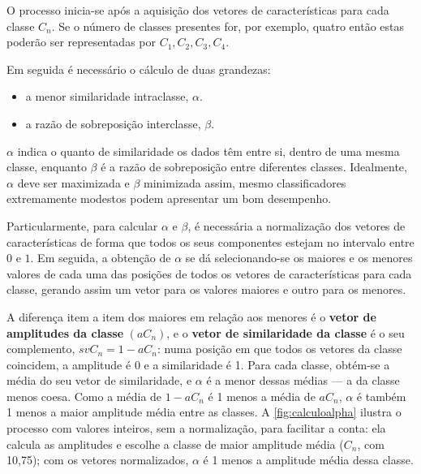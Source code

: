 			\par O processo inicia-se após a aquisição dos vetores de características para cada classe $C_n$. Se o número de classes presentes for, por exemplo, quatro então estas poderão ser representadas por $C_1, C_2, C_3, C_4$.
			\par Em seguida é necessário o cálculo de duas grandezas:
			
			\begin{itemize}
				\item a menor similaridade intraclasse, $\alpha$.
				\item a razão de sobreposição interclasse, $\beta$.
			\end{itemize}
	
			\par $\alpha$ indica o quanto de similaridade os dados têm entre si, dentro de uma mesma classe, enquanto $\beta$ é a razão de sobreposição entre diferentes classes. Idealmente, $\alpha$ deve ser maximizada e $\beta$ minimizada assim, mesmo classificadores extremamente modestos podem apresentar um bom desempenho.
			
			\par Particularmente, para calcular $\alpha$ e $\beta$, é necessária a normalização dos vetores de características de forma que todos os seus componentes estejam no intervalo entre $0$ e $1$. Em seguida, a obtenção de $\alpha$ se dá selecionando-se os maiores e os menores valores de cada uma das posições de todos os vetores de características para cada classe, gerando assim um vetor para os valores maiores e outro para os menores.
			
			\par A diferença item a item dos maiores em relação aos menores é o \textbf{vetor de amplitudes da classe} $(aC_n)$, e o \textbf{vetor de similaridade da classe} é o seu complemento, $svC_n = 1 - aC_n$: numa posição em que todos os vetores da classe coincidem, a amplitude é 0 e a similaridade é 1. Para cada classe, obtém-se a média do seu vetor de similaridade, e $\alpha$ é a menor dessas médias --- a da classe menos coesa. Como a média de $1 - aC_n$ é 1 menos a média de $aC_n$, $\alpha$ é também 1 menos a maior amplitude média entre as classes. A \autoref{fig:calculoalpha} ilustra o processo com valores inteiros, sem a normalização, para facilitar a conta: ela calcula as amplitudes e escolhe a classe de maior amplitude média ($C_n$, com 10,75); com os vetores normalizados, $\alpha$ é 1 menos a amplitude média dessa classe.
	
